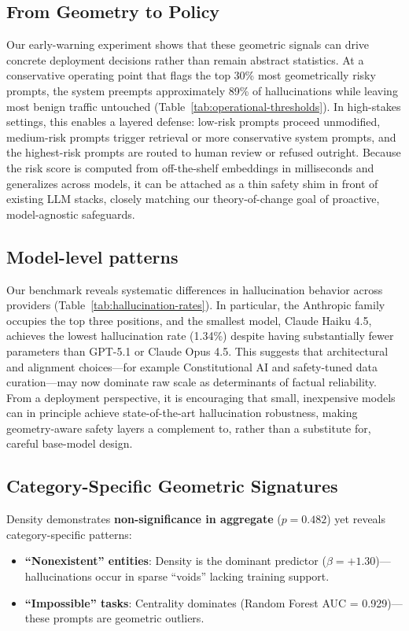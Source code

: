 \documentclass{article}
\begin{document}
\subsection{From Geometry to Policy}
Our early-warning experiment shows that these geometric signals can drive concrete deployment decisions rather than remain abstract statistics. At a conservative operating point that flags the top 30\% most geometrically risky prompts, the system preempts approximately 89\% of hallucinations while leaving most benign traffic untouched (Table~\ref{tab:operational-thresholds}). In high-stakes settings, this enables a layered defense: low-risk prompts proceed unmodified, medium-risk prompts trigger retrieval or more conservative system prompts, and the highest-risk prompts are routed to human review or refused outright. Because the risk score is computed from off-the-shelf embeddings in milliseconds and generalizes across models, it can be attached as a thin safety shim in front of existing LLM stacks, closely matching our theory-of-change goal of proactive, model-agnostic safeguards.
\subsection{Model-level patterns}
Our benchmark reveals systematic differences in hallucination behavior across providers (Table~\ref{tab:hallucination-rates}). In particular, the Anthropic family occupies the top three positions, and the smallest model, Claude Haiku 4.5, achieves the lowest hallucination rate (1.34\%) despite having substantially fewer parameters than GPT-5.1 or Claude Opus 4.5. This suggests that architectural and alignment choices---for example Constitutional AI and safety-tuned data curation---may now dominate raw scale as determinants of factual reliability. From a deployment perspective, it is encouraging that small, inexpensive models can in principle achieve state-of-the-art hallucination robustness, making geometry-aware safety layers a complement to, rather than a substitute for, careful base-model design.
\subsection{Category-Specific Geometric Signatures}
Density demonstrates \textbf{non-significance in aggregate} ($p=0.482$) yet reveals category-specific patterns:
\begin{itemize}
    \item \textbf{``Nonexistent'' entities}: Density is the dominant predictor ($\beta=+1.30$)---hallucinations occur in sparse ``voids'' lacking training support.
    \item \textbf{``Impossible'' tasks}: Centrality dominates (Random Forest AUC = 0.929)---these prompts are geometric outliers.
\end{itemize}
\end{document}
